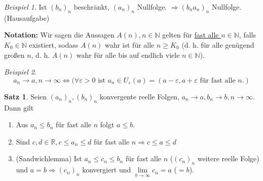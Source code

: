 \documentclass[12pt,a4paper,titlepage]{article} %
\theoremstyle{definition}
\newtheorem{satz}{Satz}[subsection]
\theoremstyle{remark}
\newtheorem*{bsp}{Beispiel}
\newcommand{\N}{\mathbb{N}}
\newcommand{\R}{\mathbb{R}}
\begin{document}
\begin{bsp}
	Ist \((b_n)_n\) beschränkt, \((a_n)_n\) Nullfolge. \(\Rightarrow (b_n a_n)_n \) Nullfolge. (Hausaufgabe)
\end{bsp}
\textbf{Notation:} Wir sagen die Aussagen \(A(n), n\in\N\) gelten für \underline{fast alle \(n\in\N\)}, falls \(K_0\in\N\) existiert, sodass \(A(n)\) wahr ist für alle \(n\geq K_0\) (d. h. für alle genügend großen \(n\), d. h. \(A(n)\) wahr für alle bis auf endlich viele \(n\in\N\)).
\begin{bsp}
	\[ a_n\rightarrow a,n\rightarrow\infty \Leftrightarrow (\forall \varepsilon > 0 \text{ ist } a_n\in U_\varepsilon(a) = (a-\varepsilon, a+\varepsilon \text{ für fast alle } n.)  \]
\end{bsp}
\begin{satz}
	Seien \((a_n)_n, (b_n)_n\) konvergente reelle Folgen, \(a_n\rightarrow a, b_n \rightarrow b, n\rightarrow\infty\). Dann gilt
	\begin{enumerate}
			\item Aus \(a_n\leq b_n\) für fast alle \(n\) folgt \(a\leq b\).
			\item Sind \(c,d\in\R, c\leq a_n\leq d \) für fast alle \(n \Rightarrow c\leq a\leq d\)
			\item (Sandwichlemma) Ist \(a_n \leq c_n \leq b_n \) für fast alle \(n\) (\((c_n)_n\) weitere reelle Folge) und \(a=b \Rightarrow (c_n)_n\) konvergiert und \( \lim\limits_{b\rightarrow\infty}c_n = a\) (\(=b\)).
	\end{enumerate}
\end{satz}
\end{document}
